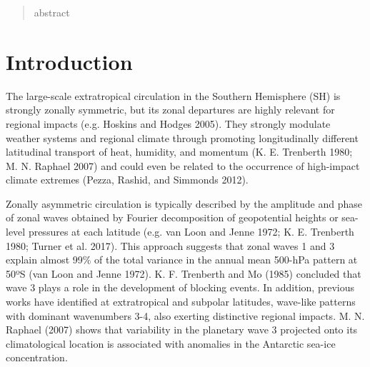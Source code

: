 \documentclass[smallextended]{svjour3}       %
\begin{document}
\date{Received: date / Accepted: date}


\maketitle

\begin{abstract}
abstract
\\
\keywords{
         \and
    }


\end{abstract}


\def\spacingset#1{\renewcommand{\baselinestretch}%
{#1}\small\normalsize} \spacingset{1}


\hypertarget{introduction}{%
\section{Introduction}\label{introduction}}

The large-scale extratropical circulation in the Southern Hemisphere (SH) is strongly zonally symmetric, but its zonal departures are highly relevant for regional impacts (e.g. Hoskins and Hodges 2005).
They strongly modulate weather systems and regional climate through promoting longitudinally different latitudinal transport of heat, humidity, and momentum (K. E. Trenberth 1980; M. N. Raphael 2007) and could even be related to the occurrence of high-impact climate extremes (Pezza, Rashid, and Simmonds 2012).

Zonally asymmetric circulation is typically described by the amplitude and phase of zonal waves obtained by Fourier decomposition of geopotential heights or sea-level pressures at each latitude (e.g. van Loon and Jenne 1972; K. E. Trenberth 1980; Turner et al. 2017).
This approach suggests that zonal waves 1 and 3 explain almost 99\% of the total variance in the annual mean 500-hPa pattern at 50ºS (van Loon and Jenne 1972).
K. F. Trenberth and Mo (1985) concluded that wave 3 plays a role in the development of blocking events.
In addition, previous works have identified at extratropical and subpolar latitudes, wave-like patterns with dominant wavenumbers 3-4, also exerting distinctive regional impacts.
M. N. Raphael (2007) shows that variability in the planetary wave 3 projected onto its climatological location is associated with anomalies in the Antarctic sea-ice concentration.
\end{document}
